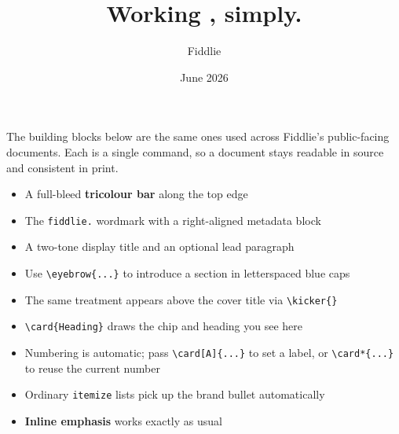\documentclass{prettydoc}
\title{Working \accentword{together}, simply.}
\author{Fiddlie}
\date{June 2026}              %
\begin{document}
\maketitle


The building blocks below are the same ones used across Fiddlie's
public-facing documents. Each is a single command, so a document stays
readable in source and consistent in print.


\begin{itemize}
  \item A full-bleed \textbf{tricolour bar} along the top edge
  \item The \texttt{fiddlie.} wordmark with a right-aligned metadata block
  \item A two-tone display title and an optional lead paragraph
\end{itemize}


\begin{itemize}
  \item Use \verb|\eyebrow{...}| to introduce a section in letterspaced blue caps
  \item The same treatment appears above the cover title via \verb|\kicker{}|
\end{itemize}


\begin{itemize}
  \item \verb|\card{Heading}| draws the chip and heading you see here
  \item Numbering is automatic; pass \verb|\card[A]{...}| to set a label, or
        \verb|\card*{...}| to reuse the current number
\end{itemize}


\begin{itemize}
  \item Ordinary \texttt{itemize} lists pick up the brand bullet automatically
  \item \textbf{Inline emphasis} works exactly as usual
\end{itemize}
\end{document}
